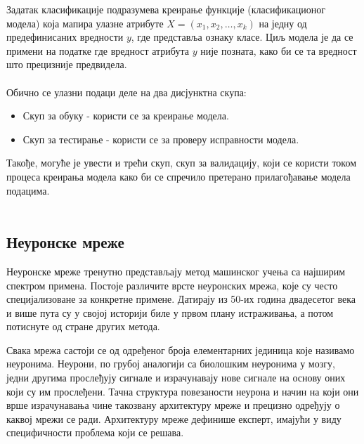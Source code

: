 \documentclass{article}
\begin{document}
Задатак класификације подразумева креирање функције (класификационог модела) која мапира улазне атрибуте $X = (x_1, x_2, \ldots, x_k)$ на једну од предефинисаних вредности $y$, где представља ознаку класе. Циљ модела је да се примени на податке где вредност атрибута $y$ није позната, како би се та вредност што прецизније предвидела.  \\ \\

Обично се улазни подаци деле на два дисјунктна скупа:

\begin{itemize}

\item Скуп за обуку - користи се за креирање модела.
\item Скуп за тестирање - користи се за проверу исправности модела.

\end{itemize}

Такође, могуће је увести и трећи скуп, скуп за валидацију, који се користи током процеса креирања модела како би се спречило претерано прилагођавање модела подацима.  \\ \\


\subsection{Неуронске мреже}
Неуронске мреже тренутно представљају метод машинског учења са најширим
спектром примена. Постоје различите врсте неуронских мрежа, које су често специјализоване за конкретне примене. Датирају из 50-их година двадесетог века и више пута
су у својој историји биле у првом плану истраживања, а потом потиснуте од
стране других метода. 

Свака мрежа састоји се од одређеног броја елементарних јединица које називамо неуронима. Неурони, по грубој аналогији са биолошким неуронима у мозгу, једни
другима прослеђују сигнале и израчунавају нове сигнале на основу оних који су
им прослеђени. Тачна структура повезаности неурона и начин на који они врше
израчунавања чине такозвану архитектуру мреже и прецизно одређују о каквој
мрежи се ради. Архитектуру мреже дефинише експерт, имајући у виду специфичности
проблема који се решава. \\ \\
\end{document}
